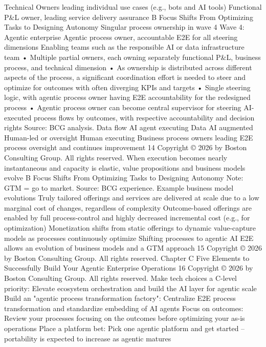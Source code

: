 Technical Owners leading individual use
cases (e.g., bots and AI tools)
Functional P\&L owner, leading service
delivery assurance
B
Focus Shifts From Optimizing Tasks to Designing Autonomy
Singular process ownership in wave 4
Wave 4: Agentic enterprise
Agentic process owner, accountable
E2E for all steering dimensions
Enabling teams such as the responsible
AI or data infrastructure team
• Multiple partial owners, each owning separately functional
P\&L, business process, and technical dimension
• As ownership is distributed across different aspects of the
process, a significant coordination effort is needed to steer
and optimize for outcomes with often diverging KPIs and targets
• Single steering logic, with agentic process owner having E2E
accountability for the redesigned process
• Agentic process owner can become central supervisor
for steering AI-executed process flows by outcomes, with
respective accountability and decision rights
Source: BCG analysis.
Data flow
AI agent executing
Data
AI augmented
Human-led or oversight
Human executing
Business process owners leading E2E process
oversight and continues improvement
14
Copyright © 2026 by Boston Consulting Group. All rights reserved.
When execution becomes nearly instantaneous and capacity is elastic,
value propositions and business models evolve
B
Focus Shifts From Optimizing Tasks to Designing Autonomy
Note: GTM = go to market.
Source: BCG experience.
Example business model evolutions
Truly tailored offerings and services are delivered at scale
due to a low marginal cost of changes, regardless of complexity
Outcome-based offerings are enabled by full process-control
and highly decreased incremental cost (e.g., for optimization)
Monetization shifts from static offerings to dynamic
value-capture models as processes continuously optimize
Shifting processes
to agentic AI E2E
allows an evolution
of business models
and a GTM approach
15
Copyright © 2026 by Boston Consulting Group. All rights reserved.
Chapter C
Five Elements to Successfully Build Your
Agentic Enterprise Operations
16
Copyright © 2026 by Boston Consulting Group. All rights reserved.
Make tech choices a C-level priority: Elevate ecosystem
orchestration and build the AI layer for agentic scale
Build an "agentic process transformation factory": Centralize
E2E process transformation and standardize embedding of AI agents
Focus on outcomes: Review your processes focusing on the
outcomes before optimizing your as-is operations
Place a platform bet: Pick one agentic platform and get started –
portability is expected to increase as agentic matures
